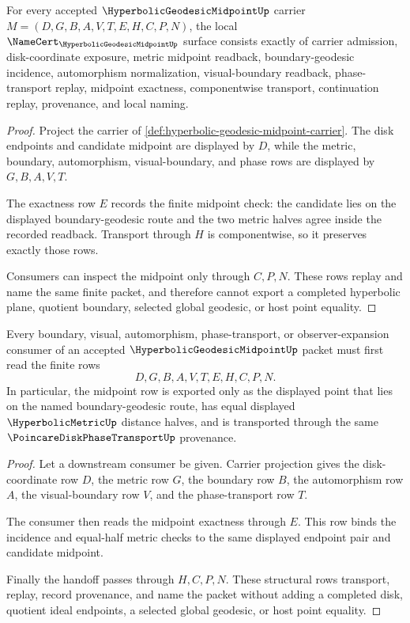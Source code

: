 \begin{theorem}
\label{thm:hyperbolic-geodesic-midpoint-namecert-obligations}
For every accepted $\HyperbolicGeodesicMidpointUp$ carrier $M=(D,G,B,A,V,T,E,H,C,P,N)$, the local $\NameCert_{\HyperbolicGeodesicMidpointUp}$ surface consists exactly of carrier admission, disk-coordinate exposure, metric midpoint readback, boundary-geodesic incidence, automorphism normalization, visual-boundary readback, phase-transport replay, midpoint exactness, componentwise transport, continuation replay, provenance, and local naming.
\end{theorem}
\begin{proof}
Project the carrier of \autoref{def:hyperbolic-geodesic-midpoint-carrier}. The disk endpoints and candidate midpoint are displayed by $D$, while the metric, boundary, automorphism, visual-boundary, and phase rows are displayed by $G,B,A,V,T$.

The exactness row $E$ records the finite midpoint check: the candidate lies on the displayed boundary-geodesic route and the two metric halves agree inside the recorded readback. Transport through $H$ is componentwise, so it preserves exactly those rows.

Consumers can inspect the midpoint only through $C,P,N$. These rows replay and name the same finite packet, and therefore cannot export a completed hyperbolic plane, quotient boundary, selected global geodesic, or host point equality.
\end{proof}

\begin{theorem}
\label{thm:hyperbolic-geodesic-midpoint-boundary-handoff}
Every boundary, visual, automorphism, phase-transport, or observer-expansion consumer of an accepted $\HyperbolicGeodesicMidpointUp$ packet must first read the finite rows
$$
D,G,B,A,V,T,E,H,C,P,N.
$$
In particular, the midpoint row is exported only as the displayed point that lies on the named boundary-geodesic route, has equal displayed $\HyperbolicMetricUp$ distance halves, and is transported through the same $\PoincareDiskPhaseTransportUp$ provenance.
\end{theorem}
\begin{proof}
Let a downstream consumer be given. Carrier projection gives the disk-coordinate row $D$, the metric row $G$, the boundary row $B$, the automorphism row $A$, the visual-boundary row $V$, and the phase-transport row $T$.

The consumer then reads the midpoint exactness through $E$. This row binds the incidence and equal-half metric checks to the same displayed endpoint pair and candidate midpoint.

Finally the handoff passes through $H,C,P,N$. These structural rows transport, replay, record provenance, and name the packet without adding a completed disk, quotient ideal endpoints, a selected global geodesic, or host point equality.
\end{proof}

